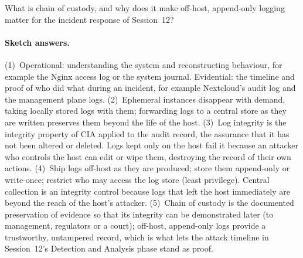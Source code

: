 \begin{exercise}
What is chain of custody, and why does it make off-host, append-only logging
matter for the incident response of Session~12?
\end{exercise}

\paragraph{Sketch answers.}
{\small
(1)~Operational: understanding the system and reconstructing behaviour, for
example the Nginx access log or the system journal. Evidential: the timeline
and proof of who did what during an incident, for example Nextcloud's audit
log and the management plane logs. (2)~Ephemeral instances disappear with
demand, taking locally stored logs with them; forwarding logs to a central
store as they are written preserves them beyond the life of the host.
(3)~Log integrity is the integrity property of CIA applied to the audit
record, the assurance that it has not been altered or deleted. Logs kept only
on the host fail it because an attacker who controls the host can edit or
wipe them, destroying the record of their own actions. (4)~Ship logs off-host
as they are produced; store them append-only or write-once; restrict who may
access the log store (least privilege). Central collection is an integrity
control because logs that left the host immediately are beyond the reach of
the host's attacker. (5)~Chain of custody is the documented preservation of
evidence so that its integrity can be demonstrated later (to management,
regulators or a court); off-host, append-only logs provide a trustworthy,
untampered record, which is what lets the attack timeline in Session~12's
Detection and Analysis phase stand as proof.}


